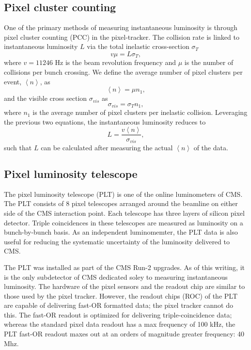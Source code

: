 \subsection{Pixel cluster counting}

One of the primary methods of measuring instantaneous luminosity is through pixel cluster counting (PCC) in the pixel-tracker. The collision rate is linked to instantaneous luminosity $L$ via the total inelastic cross-section $\sigma_T$
\begin{equation}
v \mu  = L \sigma_T,
\end{equation}
where $v=11246$ Hz is the beam revolution frequency and $\mu$ is the number of collisions per bunch crossing. We define the average number of pixel clusters per event, $\left \langle n \right \rangle$, as
\begin{equation}
\left \langle n \right \rangle = \mu n_1,
\end{equation}
and the visible cross section $\sigma_{vis}$ as 
\begin{equation}
\sigma_{vis} = \sigma_T n_1,
\end{equation}
where $n_1$ is the average number of pixel clusters per inelastic collision. Leveraging the previous two equations, the instantaneous luminosity reduces to
\begin{equation}
L = \frac{v\left \langle n \right \rangle}{\sigma_{vis}},
\end{equation}
such that $L$ can be calculated after measuring the actual $\left \langle n \right \rangle$ of the data.

\subsection{Pixel luminosity telescope}

The pixel luminosity telescope (PLT) is one of the online luminometers of CMS. The PLT consists of 8 pixel telescopes arranged around the beamline on either side of the CMS interaction point. Each telescope has three layers of silicon pixel detector. Triple coincidences in these telescopes are measured as luminosity on a bunch-by-bunch basis. As an independent luminomemter, the PLT data is also useful for reducing the systematic uncertainty of the luminosity delivered to CMS. 

The PLT was installed as part of the CMS Run-2 upgrades. As of this writing, it is the only subdetector of CMS dedicated soley to measuring instantaneous luminosity. The hardware of the pixel sensors and the readout chip are similar to those used by the pixel tracker. However, the readout chips (ROC) of the PLT are capable of delivering fast-OR formatted data; the pixel tracker cannot do this. The fast-OR readout is optimized for delivering triple-coincidence data; whereas the standard pixel data readout has a max frequency of 100 kHz, the PLT fast-OR readout maxes out at an orders of magnitude greater frequency: 40 Mhz. 


